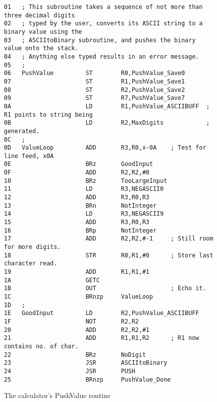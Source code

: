 \documentclass{patt}
\begin{document}
\begin{figure}
\begin{Verbatim}[fontsize=\fontsize{9}{10}\selectfont]
01   ; This subroutine takes a sequence of not more than three decimal digits 
02   ; typed by the user, converts its ASCII string to a binary value using the
03   ; ASCIItoBinary subroutine, and pushes the binary value onto the stack.
04   ; Anything else typed results in an error message.
05   ;
06   PushValue         ST        R0,PushValue_Save0
07                     ST        R1,PushValue_Save1
08                     ST        R2,PushValue_Save2
09                     ST        R7,PushValue_Save7
0A                     LD        R1,PushValue_ASCIIBUFF  ; R1 points to string being
0B                     LD        R2,MaxDigits            ; generated.
0C   ;
0D   ValueLoop         ADD       R3,R0,x-0A    ; Test for line feed, x0A
0E                     BRz       GoodInput
0F                     ADD       R2,R2,#0
10                     BRz       TooLargeInput
11                     LD        R3,NEGASCII0
12                     ADD       R3,R0,R3
13                     BRn       NotInteger
14                     LD        R3,NEGASCII9
15                     ADD       R3,R0,R3
16                     BRp       NotInteger
17                     ADD       R2,R2,#-1     ; Still room for more digits.
18                     STR       R0,R1,#0      ; Store last character read.
19                     ADD       R1,R1,#1
1A                     GETC
1B                     OUT                     ; Echo it.
1C                     BRnzp     ValueLoop
1D   ;
1E   GoodInput         LD        R2,PushValue_ASCIIBUFF
1F                     NOT       R2,R2
20                     ADD       R2,R2,#1
21                     ADD       R1,R1,R2      ; R1 now contains no. of char.
22                     BRz       NoDigit
23                     JSR       ASCIItoBinary
24                     JSR       PUSH
25                     BRnzp     PushValue_Done
\end{Verbatim}
\caption{The calculator's PushValue routine}
\label{fig:code.pushvalue}
\end{figure}
\newpage
\setcounter{figure}{15}
\end{document}
